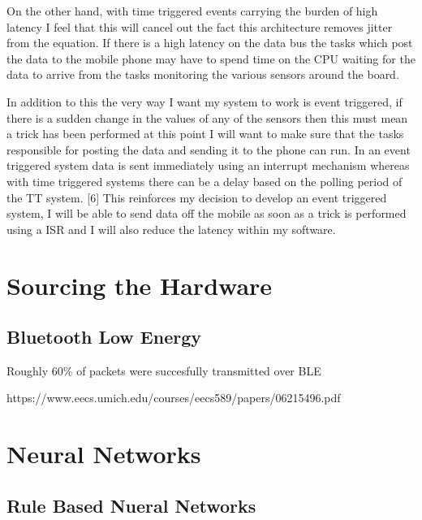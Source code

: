 On the other hand, with time triggered events carrying the burden of high latency I feel that this will cancel out the fact this architecture removes jitter from the equation. If there is a high latency on the data bus the tasks which post the data to the mobile phone may have to spend time on the CPU waiting for the data to arrive from the tasks monitoring the various sensors around the board. 

In addition to this the very way I want my system to work is event triggered, if there is a sudden change in the values of any of the sensors then this must mean a trick has been performed at this point I will want to make sure that the tasks responsible for posting the data and sending it to the phone can run. In an event triggered system data is sent immediately using an interrupt mechanism whereas with time triggered systems there can be a delay based on the polling period of the TT system. [6] This reinforces my decision to develop an event triggered system, I will be able to send data off the mobile as soon as a trick is performed using a ISR and I will also reduce the latency within my software.

\section{Sourcing the Hardware}\label{anaylsis:sourcinghardware}

\subsection{Bluetooth Low Energy}\label{anaylsis:bluetoothLE}

Roughly 60\% of packets were succesfully transmitted over BLE

https://www.eecs.umich.edu/courses/eecs589/papers/06215496.pdf

\section{Neural Networks}\label{anaylsis:neuralnetwork}

\subsection{Rule Based Nueral Networks}\label{anaylsis:ruledbasedNN}




